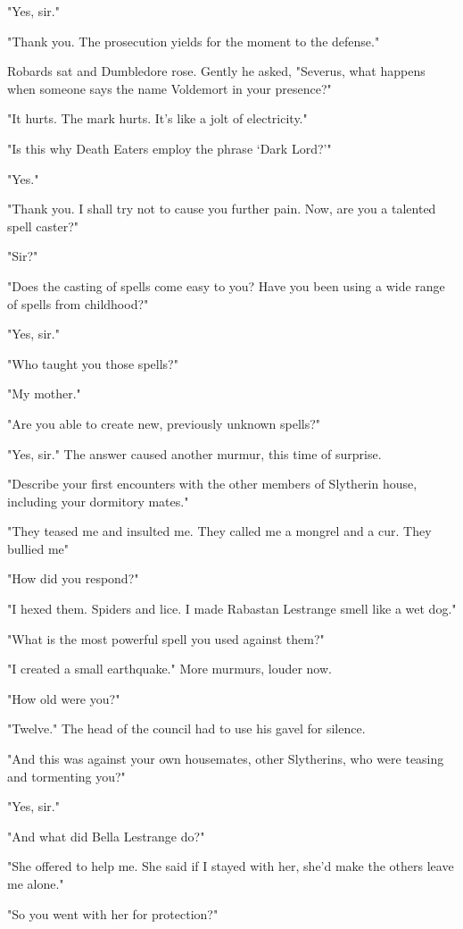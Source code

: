 "Yes, sir."

"Thank you. The prosecution yields for the moment to the defense."

Robards sat and Dumbledore rose. Gently he asked, "Severus, what happens when someone says the name Voldemort in your presence?"

"It hurts. The mark hurts. It's like a jolt of electricity."

"Is this why Death Eaters employ the phrase `Dark Lord?'"

"Yes."

"Thank you. I shall try not to cause you further pain. Now, are you a talented spell caster?"

"Sir?"

"Does the casting of spells come easy to you? Have you been using a wide range of spells from childhood?"

"Yes, sir."

"Who taught you those spells?"

"My mother."

"Are you able to create new, previously unknown spells?"

"Yes, sir." The answer caused another murmur, this time of surprise.

"Describe your first encounters with the other members of Slytherin house, including your dormitory mates."

"They teased me and insulted me. They called me a mongrel and a cur. They bullied me{\el}"

"How did you respond?"

"I hexed them. Spiders and lice. I made Rabastan Lestrange smell like a wet dog."

"What is the most powerful spell you used against them?"

"I created a small earthquake." More murmurs, louder now.

"How old were you?"

"Twelve." The head of the council had to use his gavel for silence.

"And this was against your own housemates, other Slytherins, who were teasing and tormenting you?"

"Yes, sir."

"And what did Bella Lestrange do?"

"She offered to help me. She said if I stayed with her, she'd make the others leave me alone."

"So you went with her for protection?"

